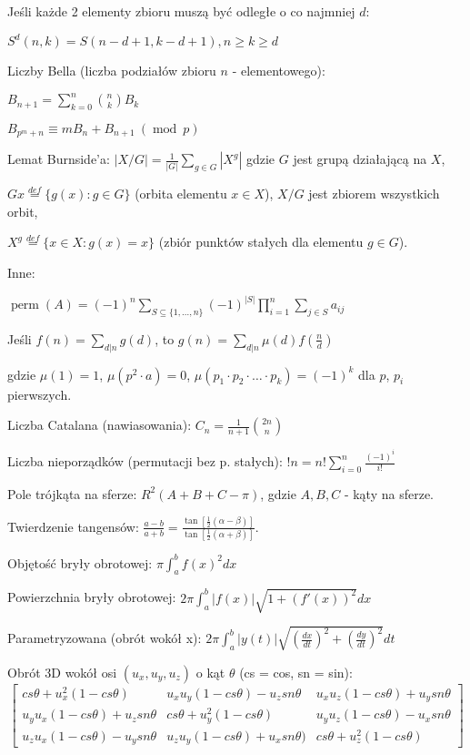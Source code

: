 \documentclass[10pt]{article}
\begin{document}
Jeśli każde 2 elementy zbioru muszą być odległe o co najmniej $d$:

$S^d(n, k) = S(n-d+1, k-d+1), n \geq k \geq d$

Liczby Bella (liczba podziałów zbioru $n$ - elementowego):
\begin{multicols}{2}

$B_{n+1}=\sum_{k=0}^{n}{{n \choose k}B_k}$

\columnbreak

$B_{p^m+n}\equiv mB_n+B_{n+1}\ (\operatorname{mod}\ p)$

\end{multicols}

Lemat Burnside'a: $|X/G| = \frac{1}{|G|}\sum_{g \in G}|X^g|$ gdzie $G$ jest grupą działającą na $X$,

$Gx \stackrel{def}{ = } \{g(x): g \in G \}$ (orbita elementu $x \in X$), $X/G$ jest zbiorem wszystkich orbit,

$X^g \stackrel{def}{ = } \{x\in X: g(x)=x\}$ (zbiór punktów stałych dla elementu $g \in G$).

Inne:

$\operatorname{perm} (A) = (-1)^n \sum_{S\subseteq\{1,\dots,n\}} (-1)^{|S|} \prod_{i=1}^n \sum_{j\in S} a_{ij}$

Jeśli $f(n)=\sum_{d|n}g(d)$, to $g(n) = \sum_{d|n}\mu(d)f\left ( \frac n d \right )$

gdzie $\mu(1) = 1$, $\mu(p^2 \cdot a) = 0$,  $\mu(p_1 \cdot p_2 \cdot \ldots \cdot p_k) = (-1)^k$ dla $p$, $p_i$ pierwszych.
 
Liczba Catalana (nawiasowania): $C_n = \frac 1 {n+1} {{2n} \choose n}$
 
Liczba nieporządków (permutacji bez p. stałych): $!n = n!\sum_{i=0}^n\frac{(-1)^i}{i!}$
 
Pole trójkąta na sferze: $R^2(A+B+C-\pi)$, gdzie $A,B,C$ - kąty na sferze.

Twierdzenie tangensów: $\frac{a-b}{a+b} = \frac{\tan[\frac{1}{2}(\alpha-\beta)]}{\tan[\frac{1}{2}(\alpha+\beta)]}.$

Objętość bryły obrotowej: $\pi \int_a^b f(x)^2 dx$

Powierzchnia bryły obrotowej: $2\pi\int_a^b|f(x)|\sqrt{1+(f'(x))^2} dx$

Parametryzowana (obrót wokół x): $2\pi\int_a^b|y(t)|\sqrt{(\frac{dx}{dt})^2+(\frac{dy}{dt})^2} dt$

Obrót 3D wokół osi $(u_x,u_y,u_z)$ o kąt $\theta$ (cs = cos, sn = sin):
$$\left[\begin{array}{ccc}
cs\theta+u_x^2(1-cs\theta)&u_x u_y (1-cs\theta)-u_z sn\theta&u_x u_z (1-cs\theta) +u_y sn\theta\\
u_y u_x (1-cs\theta)+u_z sn\theta&cs\theta+u_y^2(1-cs\theta)&u_y u_z (1-cs\theta) -u_x sn\theta\\
u_z u_x (1-cs\theta) -u_y sn\theta&u_z u_y (1-cs\theta)+u_x sn\theta)&cs\theta+u_z^2(1-cs\theta)
\end{array}\right]$$
\end{document}
